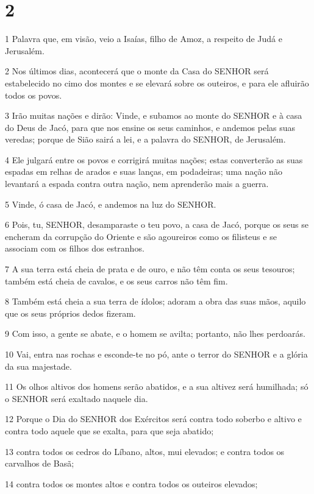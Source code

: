 \chapter{2}

\par 1 Palavra que, em visão, veio a Isaías, filho de Amoz, a respeito de Judá e Jerusalém.
\par 2 Nos últimos dias, acontecerá que o monte da Casa do SENHOR será estabelecido no cimo dos montes e se elevará sobre os outeiros, e para ele afluirão todos os povos.
\par 3 Irão muitas nações e dirão: Vinde, e subamos ao monte do SENHOR e à casa do Deus de Jacó, para que nos ensine os seus caminhos, e andemos pelas suas veredas; porque de Sião sairá a lei, e a palavra do SENHOR, de Jerusalém.
\par 4 Ele julgará entre os povos e corrigirá muitas nações; estas converterão as suas espadas em relhas de arados e suas lanças, em podadeiras; uma nação não levantará a espada contra outra nação, nem aprenderão mais a guerra.
\par 5 Vinde, ó casa de Jacó, e andemos na luz do SENHOR.
\par 6 Pois, tu, SENHOR, desamparaste o teu povo, a casa de Jacó, porque os seus se encheram da corrupção do Oriente e são agoureiros como os filisteus e se associam com os filhos dos estranhos.
\par 7 A sua terra está cheia de prata e de ouro, e não têm conta os seus tesouros; também está cheia de cavalos, e os seus carros não têm fim.
\par 8 Também está cheia a sua terra de ídolos; adoram a obra das suas mãos, aquilo que os seus próprios dedos fizeram.
\par 9 Com isso, a gente se abate, e o homem se avilta; portanto, não lhes perdoarás.
\par 10 Vai, entra nas rochas e esconde-te no pó, ante o terror do SENHOR e a glória da sua majestade.
\par 11 Os olhos altivos dos homens serão abatidos, e a sua altivez será humilhada; só o SENHOR será exaltado naquele dia.
\par 12 Porque o Dia do SENHOR dos Exércitos será contra todo soberbo e altivo e contra todo aquele que se exalta, para que seja abatido;
\par 13 contra todos os cedros do Líbano, altos, mui elevados; e contra todos os carvalhos de Basã;
\par 14 contra todos os montes altos e contra todos os outeiros elevados;
